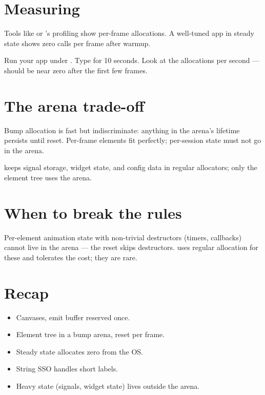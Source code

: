 \section{Measuring}

Tools like  or 's profiling
show per-frame allocations. A well-tuned \maya{} app in
steady state shows zero  calls per frame after
warmup.

\begin{tryit}
Run your app under . Type for 10 seconds.
Look at the allocations per second --- should be near zero
after the first few frames.
\end{tryit}

\section{The arena trade-off}

Bump allocation is fast but indiscriminate: anything in the
arena's lifetime persists until reset. Per-frame elements
fit perfectly; per-session state must not go in the arena.

\maya{} keeps signal storage, widget state, and config data
in regular allocators; only the element tree uses the arena.

\section{When to break the rules}

Per-element animation state with non-trivial destructors
(timers, callbacks) cannot live in the arena --- the reset
skips destructors. \maya{} uses regular allocation for these
and tolerates the cost; they are rare.

\section{Recap}

\begin{recap}
\begin{itemize}[leftmargin=*]
  \item Canvases, emit buffer reserved once.
  \item Element tree in a bump arena, reset per frame.
  \item Steady state allocates zero from the OS.
  \item String SSO handles short labels.
  \item Heavy state (signals, widget state) lives outside
    the arena.
\end{itemize}
\end{recap}

